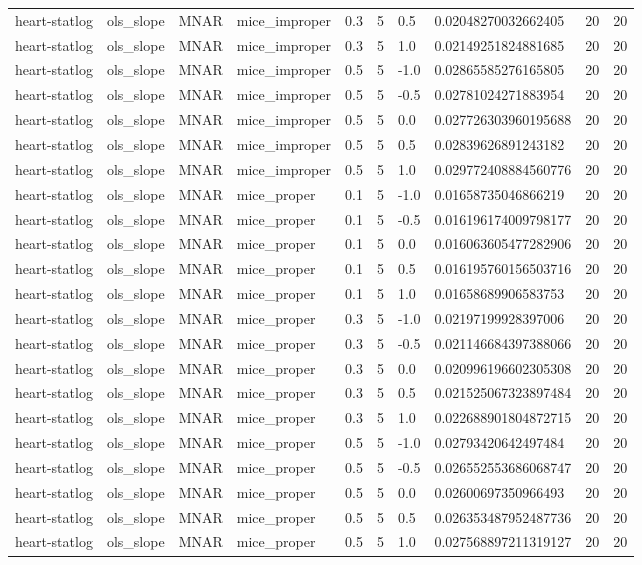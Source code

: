 \begin{tabular}{llllllllll}
heart-statlog & ols\_slope & MNAR & mice\_improper & 0.3 & 5 & 0.5 & 0.02048270032662405 & 20 & 20 \\
heart-statlog & ols\_slope & MNAR & mice\_improper & 0.3 & 5 & 1.0 & 0.02149251824881685 & 20 & 20 \\
heart-statlog & ols\_slope & MNAR & mice\_improper & 0.5 & 5 & -1.0 & 0.02865585276165805 & 20 & 20 \\
heart-statlog & ols\_slope & MNAR & mice\_improper & 0.5 & 5 & -0.5 & 0.02781024271883954 & 20 & 20 \\
heart-statlog & ols\_slope & MNAR & mice\_improper & 0.5 & 5 & 0.0 & 0.027726303960195688 & 20 & 20 \\
heart-statlog & ols\_slope & MNAR & mice\_improper & 0.5 & 5 & 0.5 & 0.02839626891243182 & 20 & 20 \\
heart-statlog & ols\_slope & MNAR & mice\_improper & 0.5 & 5 & 1.0 & 0.029772408884560776 & 20 & 20 \\
heart-statlog & ols\_slope & MNAR & mice\_proper & 0.1 & 5 & -1.0 & 0.01658735046866219 & 20 & 20 \\
heart-statlog & ols\_slope & MNAR & mice\_proper & 0.1 & 5 & -0.5 & 0.016196174009798177 & 20 & 20 \\
heart-statlog & ols\_slope & MNAR & mice\_proper & 0.1 & 5 & 0.0 & 0.016063605477282906 & 20 & 20 \\
heart-statlog & ols\_slope & MNAR & mice\_proper & 0.1 & 5 & 0.5 & 0.016195760156503716 & 20 & 20 \\
heart-statlog & ols\_slope & MNAR & mice\_proper & 0.1 & 5 & 1.0 & 0.01658689906583753 & 20 & 20 \\
heart-statlog & ols\_slope & MNAR & mice\_proper & 0.3 & 5 & -1.0 & 0.02197199928397006 & 20 & 20 \\
heart-statlog & ols\_slope & MNAR & mice\_proper & 0.3 & 5 & -0.5 & 0.021146684397388066 & 20 & 20 \\
heart-statlog & ols\_slope & MNAR & mice\_proper & 0.3 & 5 & 0.0 & 0.020996196602305308 & 20 & 20 \\
heart-statlog & ols\_slope & MNAR & mice\_proper & 0.3 & 5 & 0.5 & 0.021525067323897484 & 20 & 20 \\
heart-statlog & ols\_slope & MNAR & mice\_proper & 0.3 & 5 & 1.0 & 0.022688901804872715 & 20 & 20 \\
heart-statlog & ols\_slope & MNAR & mice\_proper & 0.5 & 5 & -1.0 & 0.02793420642497484 & 20 & 20 \\
heart-statlog & ols\_slope & MNAR & mice\_proper & 0.5 & 5 & -0.5 & 0.026552553686068747 & 20 & 20 \\
heart-statlog & ols\_slope & MNAR & mice\_proper & 0.5 & 5 & 0.0 & 0.02600697350966493 & 20 & 20 \\
heart-statlog & ols\_slope & MNAR & mice\_proper & 0.5 & 5 & 0.5 & 0.026353487952487736 & 20 & 20 \\
heart-statlog & ols\_slope & MNAR & mice\_proper & 0.5 & 5 & 1.0 & 0.027568897211319127 & 20 & 20 \\
\hline
\end{tabular}

